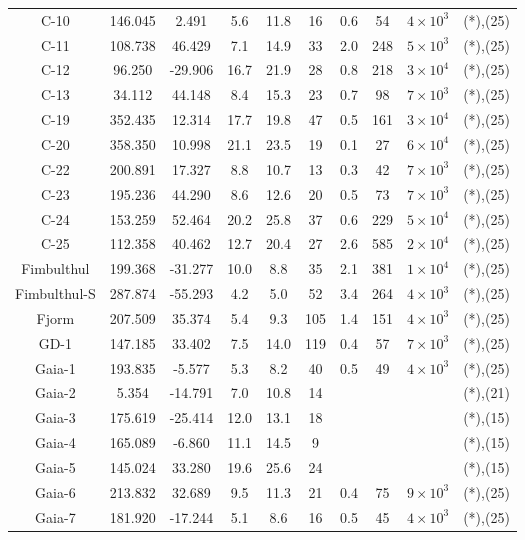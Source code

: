 \begin{table}
\begin{tabular}{cSSSScSccc}
C-10 & 146.045 & 2.491 & 5.6 & 11.8 & 16 & 0.6 & 54 & $4 \times 10^{3}$ & (*),(25) \\
C-11 & 108.738 & 46.429 & 7.1 & 14.9 & 33 & 2.0 & 248 & $5 \times 10^{3}$ & (*),(25) \\
C-12 & 96.250 & -29.906 & 16.7 & 21.9 & 28 & 0.8 & 218 & $3 \times 10^{4}$ & (*),(25) \\
C-13 & 34.112 & 44.148 & 8.4 & 15.3 & 23 & 0.7 & 98 & $7 \times 10^{3}$ & (*),(25) \\
C-19 & 352.435 & 12.314 & 17.7 & 19.8 & 47 & 0.5 & 161 & $3 \times 10^{4}$ & (*),(25) \\
C-20 & 358.350 & 10.998 & 21.1 & 23.5 & 19 & 0.1 & 27 & $6 \times 10^{4}$ & (*),(25) \\
C-22 & 200.891 & 17.327 & 8.8 & 10.7 & 13 & 0.3 & 42 & $7 \times 10^{3}$ & (*),(25) \\
C-23 & 195.236 & 44.290 & 8.6 & 12.6 & 20 & 0.5 & 73 & $7 \times 10^{3}$ & (*),(25) \\
C-24 & 153.259 & 52.464 & 20.2 & 25.8 & 37 & 0.6 & 229 & $5 \times 10^{4}$ & (*),(25) \\
C-25 & 112.358 & 40.462 & 12.7 & 20.4 & 27 & 2.6 & 585 & $2 \times 10^{4}$ & (*),(25) \\
Fimbulthul & 199.368 & -31.277 & 10.0 & 8.8 & 35 & 2.1 & 381 & $1 \times 10^{4}$ & (*),(25) \\
Fimbulthul-S & 287.874 & -55.293 & 4.2 & 5.0 & 52 & 3.4 & 264 & $4 \times 10^{3}$ & (*),(25) \\
Fjorm & 207.509 & 35.374 & 5.4 & 9.3 & 105 & 1.4 & 151 & $4 \times 10^{3}$ & (*),(25) \\
GD-1 & 147.185 & 33.402 & 7.5 & 14.0 & 119 & 0.4 & 57 & $7 \times 10^{3}$ & (*),(25) \\
Gaia-1 & 193.835 & -5.577 & 5.3 & 8.2 & 40 & 0.5 & 49 & $4 \times 10^{3}$ & (*),(25) \\
Gaia-2 & 5.354 & -14.791 & 7.0 & 10.8 & 14 & & & & (*),(21) \\
Gaia-3 & 175.619 & -25.414 & 12.0 & 13.1 & 18 & & & & (*),(15) \\
Gaia-4 & 165.089 & -6.860 & 11.1 & 14.5 & 9 & & & & (*),(15) \\
Gaia-5 & 145.024 & 33.280 & 19.6 & 25.6 & 24 & & & & (*),(15) \\
Gaia-6 & 213.832 & 32.689 & 9.5 & 11.3 & 21 & 0.4 & 75 & $9 \times 10^{3}$ & (*),(25) \\
Gaia-7 & 181.920 & -17.244 & 5.1 & 8.6 & 16 & 0.5 & 45 & $4 \times 10^{3}$ & (*),(25) \\
\hline \hline
\end{tabular}
\end{table}
